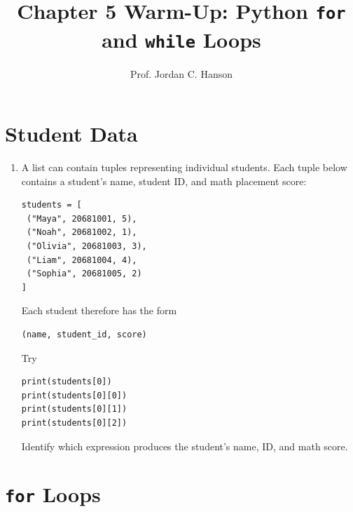 \documentclass{article}
\begin{document}
\twocolumn

\title{Chapter 5 Warm-Up: Python \texttt{for} and \texttt{while} Loops}
\author{Prof. Jordan C. Hanson}
\date{}

\maketitle

\section{Student Data}

\begin{enumerate}

\item A list can contain tuples representing individual students.
Each tuple below contains a student's name, student ID, and math
placement score:

\begin{verbatim}
students = [
 ("Maya", 20681001, 5),
 ("Noah", 20681002, 1),
 ("Olivia", 20681003, 3),
 ("Liam", 20681004, 4),
 ("Sophia", 20681005, 2)
]
\end{verbatim}

Each student therefore has the form

\begin{verbatim}
(name, student_id, score)
\end{verbatim}

Try

\begin{verbatim}
print(students[0])
print(students[0][0])
print(students[0][1])
print(students[0][2])
\end{verbatim}

Identify which expression produces the student's name,
ID, and math score.

\end{enumerate}


\section{\texttt{for} Loops}
\end{document}
